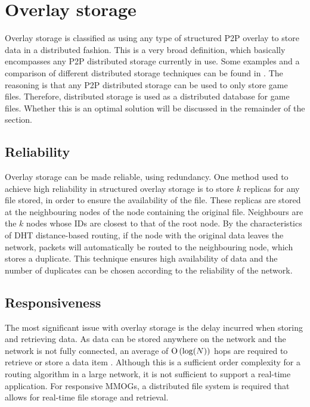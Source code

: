 \section{Overlay storage}
\label{overlay_storage}

Overlay storage is classified as using any type of structured P2P overlay to store data in a distributed fashion. This is a very broad definition,
which basically encompasses any P2P distributed storage currently in use. Some examples and a comparison of different distributed storage techniques
can be found in \cite{Hasan_distributed_storage_survey}. The reasoning is that any P2P distributed storage can be used to only store game files.
Therefore, distributed storage is used as a distributed database for game files. Whether this is an optimal solution will be discussed in the
remainder of the section.

\subsection{Reliability}
\label{overlay_storage_reliability}

Overlay storage can be made reliable, using redundancy. One method used to achieve high reliability in structured overlay storage is to store $k$
replicas for any file stored, in order to ensure the availability of the file. These replicas are stored at the neighbouring nodes of the node
containing the original file. Neighbours are the $k$ nodes whose IDs are closest to that of the root node. By the characteristics of DHT
distance-based routing, if the node with the original data leaves the network, packets will automatically be routed to the neighbouring node, which
stores a duplicate. This technique ensures high availability of data and the number of duplicates can be chosen according to the reliability of the
network.


\subsection{Responsiveness}

The most significant issue with overlay storage is the delay incurred when storing and retrieving data. As data can be stored anywhere on the network
and the network is not fully connected, an average of $\operatorname{O}\left(\log(N)\right)$ hops are required to retrieve or store a data item
\cite{storage_and_chaching_PAST}. Although this is a sufficient order complexity for a routing algorithm in a large network, it is not sufficient to
support a real-time application. For responsive MMOGs, a distributed file system is required that allows for real-time file storage and retrieval.

